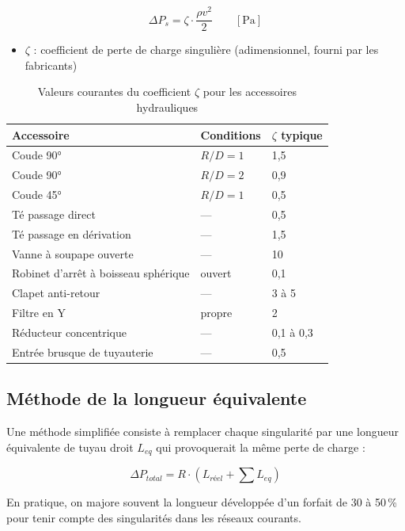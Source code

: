 \begin{equation}
  \Delta P_s = \zeta \cdot \frac{\rho v^2}{2} \qquad \left[\si{\pascal}\right]
  \label{eq:singuliere}
\end{equation}
\begin{itemize}
  \item $\zeta$ : coefficient de perte de charge singulière (adimensionnel, fourni par les fabricants)
\end{itemize}

\begin{table}[H]
  \centering
  \caption{Valeurs courantes du coefficient $\zeta$ pour les accessoires hydrauliques}
  \begin{tabular}{lll}
    \toprule
    Accessoire & Conditions & $\zeta$ typique \\
    \midrule
    Coude 90° & $R/D = 1$ & 1{,}5 \\
    Coude 90° & $R/D = 2$ & 0{,}9 \\
    Coude 45° & $R/D = 1$ & 0{,}5 \\
    Té passage direct & — & 0{,}5 \\
    Té passage en dérivation & — & 1{,}5 \\
    Vanne à soupape ouverte & — & 10 \\
    Robinet d'arrêt à boisseau sphérique & ouvert & 0{,}1 \\
    Clapet anti-retour & — & 3 à 5 \\
    Filtre en Y & propre & 2 \\
    Réducteur concentrique & — & 0{,}1 à 0{,}3 \\
    Entrée brusque de tuyauterie & — & 0{,}5 \\
    \bottomrule
  \end{tabular}
\end{table}

\subsection{Méthode de la longueur équivalente}

Une méthode simplifiée consiste à remplacer chaque singularité par une longueur équivalente de tuyau droit $L_{eq}$ qui provoquerait la même perte de charge :

\begin{equation}
  \Delta P_{total} = R \cdot (L_{réel} + \sum L_{eq})
\end{equation}

En pratique, on majore souvent la longueur développée d'un forfait de 30 à 50\,\% pour tenir compte des singularités dans les réseaux courants.

